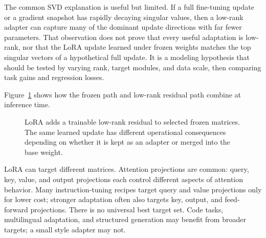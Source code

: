 The common SVD explanation is useful but limited. If a full fine-tuning update or a gradient snapshot has rapidly decaying singular values, then a low-rank adapter can capture many of the dominant update directions with far fewer parameters. That observation does not prove that every useful adaptation is low-rank, nor that the LoRA update learned under frozen weights matches the top singular vectors of a hypothetical full update. It is a modeling hypothesis that should be tested by varying rank, target modules, and data scale, then comparing task gains and regression losses.

Figure~\ref{fig:lora-low-rank-path} shows how the frozen path and low-rank residual path combine at inference time.

\begin{figure}[t]
\centering
{}
\caption{LoRA adds a trainable low-rank residual to selected frozen matrices. The same learned update has different operational consequences depending on whether it is kept as an adapter or merged into the base weight.}
\label{fig:lora-low-rank-path}
\end{figure}

LoRA can target different matrices. Attention projections are common: query, key, value, and output projections each control different aspects of attention behavior. Many instruction-tuning recipes target query and value projections only for lower cost; stronger adaptation often also targets key, output, and feed-forward projections. There is no universal best target set. Code tasks, multilingual adaptation, and structured generation may benefit from broader targets; a small style adapter may not.

